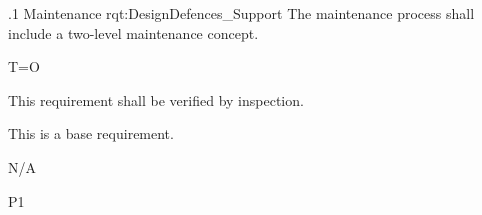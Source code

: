 \ONERQMTV
{\RqtNumberBase.1}
{Maintenance}
{rqt:DesignDefences_Support}
{The \ThisSys maintenance process shall include a two-level maintenance concept.}
{
	\item T=O
}
{This requirement shall be verified by inspection.}
{
\item [N/A] This is a base requirement.
}
{
	\item N/A
}
{P1}
